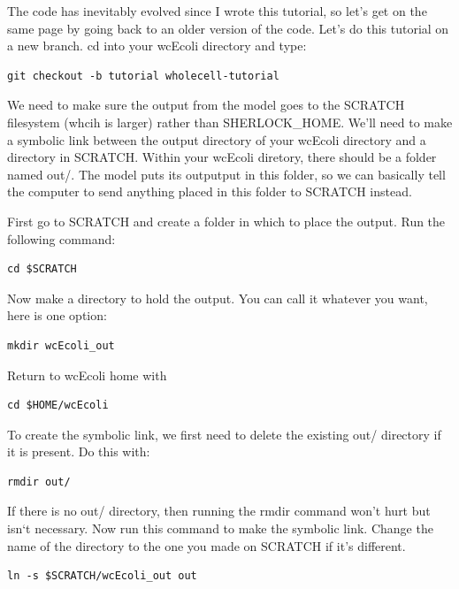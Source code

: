 \documentclass[12pt]{article}
\begin{document}
The code has inevitably evolved since I wrote this tutorial, so let’s get on the same page by going back to an older version of the code. Let’s do this tutorial on a new branch. cd into your wcEcoli directory and type:

\lstset{language=bash}
\begin{lstlisting}
git checkout -b tutorial wholecell-tutorial
\end{lstlisting}

We need to make sure the output from the model goes to the SCRATCH filesystem (whcih is larger) rather than SHERLOCK\_HOME. We'll need to make a symbolic link between the output directory of your wcEcoli directory and a directory in SCRATCH. Within your wcEcoli diretory, there should be a folder named out/. The model puts its outputput in this folder, so we can basically tell the computer to send anything placed in this folder to SCRATCH instead.

First go to SCRATCH and create a folder in which to place the output. Run the following command:

\lstset{language=bash}
\begin{lstlisting}
cd $SCRATCH
\end{lstlisting}

Now make a directory to hold the output. You can call it whatever you want, here is one option:

\lstset{language=bash}
\begin{lstlisting}
mkdir wcEcoli_out
\end{lstlisting}

Return to wcEcoli home with

\lstset{language=bash}
\begin{lstlisting}
cd $HOME/wcEcoli
\end{lstlisting}

To create the symbolic link, we first need to delete the existing out/ directory if it is present. Do this with:

\lstset{language=bash}
\begin{lstlisting}
rmdir out/
\end{lstlisting}

If there is no out/ directory, then running the rmdir command won't hurt but isn`t necessary. Now run this command to make the symbolic link. Change the name of the directory to the one you made on SCRATCH if it's different.

\lstset{language=bash}
\begin{lstlisting}
ln -s $SCRATCH/wcEcoli_out out
\end{lstlisting}
\end{document}
